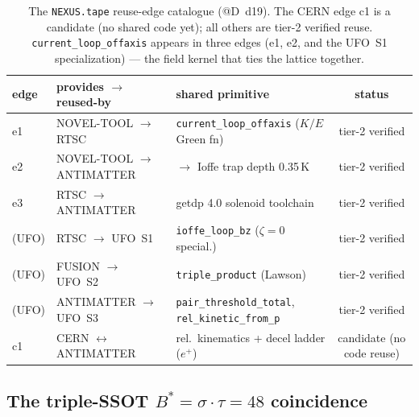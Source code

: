 \begin{table}[h]
\centering
\footnotesize
\setlength{\tabcolsep}{4pt}
\begin{tabular}{@{}l >{\raggedright\arraybackslash}m{3.4cm} >{\raggedright\arraybackslash}m{3.6cm} c@{}}
\toprule
\textbf{edge} & \textbf{provides $\to$ reused-by} & \textbf{shared primitive} & \textbf{status} \\
\midrule
e1 & NOVEL-TOOL $\to$ RTSC & \texttt{current\_loop\_offaxis} ($K/E$ Green fn) & tier-2 verified \\
e2 & NOVEL-TOOL $\to$ ANTIMATTER & $\to$ Ioffe trap depth 0.35\,K & tier-2 verified \\
e3 & RTSC $\to$ ANTIMATTER & getdp 4.0 solenoid toolchain & tier-2 verified \\
(UFO) & RTSC $\to$ UFO~S1 & \texttt{ioffe\_loop\_bz} ($\zeta{=}0$ special.) & tier-2 verified \\
(UFO) & FUSION $\to$ UFO~S2 & \texttt{triple\_product} (Lawson) & tier-2 verified \\
(UFO) & ANTIMATTER $\to$ UFO~S3 & \texttt{pair\_threshold\_total}, \texttt{rel\_kinetic\_from\_p} & tier-2 verified \\
c1 & CERN $\leftrightarrow$ ANTIMATTER & rel.\ kinematics + decel ladder ($e^+$) & candidate (no code reuse) \\
\bottomrule
\end{tabular}
\caption{The \texttt{NEXUS.tape} reuse-edge catalogue (@D~d19). The CERN
edge c1 is a candidate (no shared code yet); all others are tier-2
verified reuse. \texttt{current\_loop\_offaxis} appears in three edges
(e1, e2, and the UFO~S1 specialization) --- the field kernel that ties
the lattice together.}
\label{tab:int-edges}
\end{table}

\subsection{The triple-SSOT $B^{*}=\sigma\!\cdot\!\tau=48$ coincidence}
\label{app:int-bstar}

